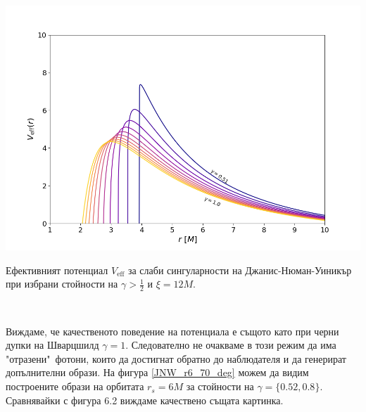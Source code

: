 \begin{minipage}{18em}
	\hspace{-0.5cm}
	\includegraphics[scale = 0.3]{JNW_eff_potential_photon_sphere.png}
	\caption[Ефективният потенциал за слаби сингуларности на Джанис-Нюман-Уиникър]{Ефективният потенциал $V_\text{eff}$ за слаби сингуларности на Джанис-Нюман-Уиникър при избрани стойности на $\gamma > \frac{1}{2}$ и $\xi = 12M$.}
\end{minipage}\,\,
\begin{minipage}{18em}
	Виждаме, че качественото поведение на потенциала е същото като при черни дупки на Шварцшилд $\gamma = 1$. Следователно не очакваме в този режим да има "отразени"$\,$ фотони, които да достигнат обратно до наблюдателя и да генерират допълнителни образи. На фигура \ref{JNW_r6_70_deg} можем да видим построените образи на орбитата $r_s = 6M$ за стойности на $\gamma = \{0.52, 0.8\}$. Сравнявайки с фигура 6.2 виждаме качествено същата картинка.
\end{minipage}
